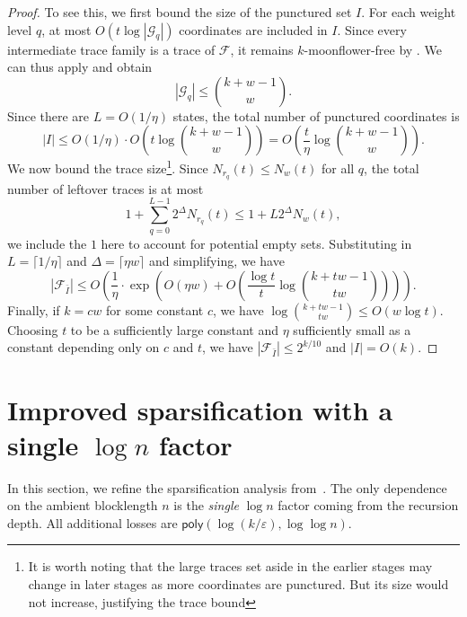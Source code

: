 \documentclass{article}
\newcommand{\poly}{\mathsf{poly}}
\newcommand{\<}{\langle}
\renewcommand{\>}{\rangle}
\newcommand{\calF}{\mathcal{F}}
\newcommand{\calG}{\mathcal{G}}
\begin{document}
{\begin{proof}
    To see this, we first bound the size of the punctured set $I$. For each weight level $q$, at most $O(t \log |\calG_q|)$ coordinates are included in $I$. Since every intermediate trace family is a trace of $\calF$, it remains $k$-moonflower-free by . We can thus apply  and obtain
    \[
    |\calG_q| \leq \binom{k+w-1}{w}.
    \]
    Since there are $L = O(1/ \eta)$ states, the total number of punctured coordinates is
    \[
    |I| \leq O(1/\eta) \cdot O\left( t \log \binom{k+w-1}{w}\right) = O\left(\frac{t}{\eta} \log \binom{k+w-1}{w} \right).
    \]
    We now bound the trace size\footnote{It is worth noting that the large traces set aside in the earlier stages may change in later stages as more coordinates are punctured. But its size would not increase, justifying the trace bound}. Since $N_{r_q}(t) \leq N_w (t)$ for all $q$, the total number of leftover traces is at most 
    \[
    1 + \sum_{q=0}^{L-1}2^{\Delta} N_{r_q}(t) \leq 1 + L2^{\Delta}N_w(t),
    \]
    we include the $1$ here to account for potential empty sets. Substituting in $L = \lceil 1 / \eta \rceil$ and $\Delta = \lceil \eta w \rceil$ and simplifying, we have
    \[
    |\calF_{\bar{I}}| \leq O \left(\frac{1}{\eta} \cdot \exp \left(O(\eta w) + O \left(\frac{\log t}{t} \log \binom{k+tw-1}{tw} \right) \right) \right).
    \]
    Finally, if $k = c w$ for some constant $c$, we have $\log \binom{k+tw-1}{tw} \leq O(w \log t)$. Choosing $t$ to be a sufficiently large constant and $\eta$ sufficiently small as a constant depending only on $c$ and $t$, we have $|\calF_{\bar{I}}| \leq 2^{k/10}$ and $|I| = O(k)$.
\end{proof}
}





\section{Improved sparsification with a single $\log n$ factor}
\label{sec:sparsification_single_log_n}



In this section, we refine the sparsification analysis from~\cite{BG25}.
The only dependence on the ambient blocklength $n$ is the \emph{single} $\log n$ factor
coming from the recursion depth.
All additional losses are $\poly(\log(k/\varepsilon),\log\log n)$.
\end{document}

